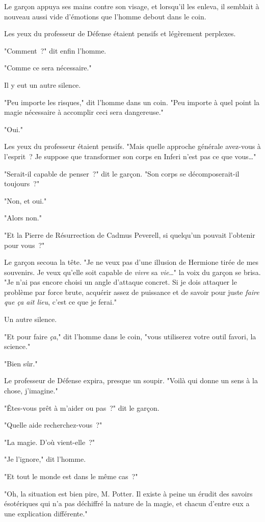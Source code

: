 Le garçon appuya ses mains contre son visage, et lorsqu'il les enleva, il semblait à nouveau aussi vide d'émotions que l'homme debout dans le coin.

Les yeux du professeur de Défense étaient pensifs et légèrement perplexes.

"Comment~?" dit enfin l'homme.

"Comme ce sera nécessaire."

Il y eut un autre silence.

"Peu importe les risques," dit l'homme dans un coin. "Peu importe à quel point la magie nécessaire à accomplir ceci sera dangereuse."

"Oui."

Les yeux du professeur étaient pensifs. "Mais quelle approche générale avez-vous à l'esprit~? Je suppose que transformer son corps en Inferi n'est pas ce que vous…"

"Serait-il capable de penser~?" dit le garçon. "Son corps se décomposerait-il toujours~?"

"Non, et oui."

"Alors non."

"Et la Pierre de Résurrection de Cadmus Peverell, si quelqu'un pouvait l'obtenir pour vous~?"

Le garçon secoua la tête. "Je ne veux pas d'une illusion de Hermione tirée de mes souvenirs. Je veux qu'elle soit capable de \emph{vivre} sa \emph{vie}…" la voix du garçon se brisa. "Je n'ai pas encore choisi un angle d'attaque concret. Si je dois attaquer le problème par force brute, acquérir assez de puissance et de savoir pour juste \emph{faire que ça ait lieu}, c'est ce que je ferai."

Un autre silence.

"Et pour faire \emph{ça}," dit l'homme dans le coin, "vous utiliserez votre outil favori, la science."

"Bien sûr."

Le professeur de Défense expira, presque un soupir. "Voilà qui donne un sens à la chose, j'imagine."

"Êtes-vous prêt à m'aider ou pas~?" dit le garçon.

"Quelle aide recherchez-vous~?"

"La magie. D'où vient-elle~?"

"Je l'ignore," dit l'homme.

"Et tout le monde est dans le même cas~?"

"Oh, la situation est bien pire, M. Potter. Il existe à peine un érudit des savoirs ésotériques qui n'a pas déchiffré la nature de la magie, et chacun d'entre eux a une explication différente."

